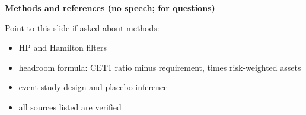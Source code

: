 {\small\textbf{Methods and references (no speech; for questions)}}\par\smallskip
Point to this slide if asked about methods:
\begin{itemize}\setlength\itemsep{0pt}
\item HP and Hamilton filters
\item headroom formula: CET1 ratio minus requirement, times risk-weighted assets
\item event-study design and placebo inference
\item all sources listed are verified
\end{itemize}
